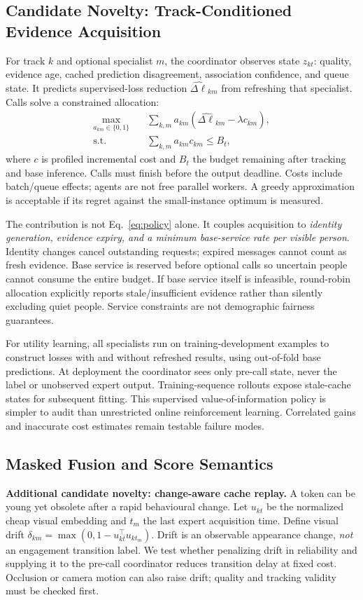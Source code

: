 \documentclass[a4paper,conference]{IEEEtran}
\begin{document}
\subsection{Candidate Novelty: Track-Conditioned Evidence Acquisition}
For track $k$ and optional specialist $m$, the coordinator observes state $z_{kt}$: quality, evidence age, cached prediction disagreement, association confidence, and queue state. It predicts supervised-loss reduction $\widehat{\Delta\ell}_{km}$ from refreshing that specialist. Calls solve a constrained allocation:
\begin{align}
\max_{a_{km}\in\{0,1\}}\quad &\sum_{k,m}a_{km}(\widehat{\Delta\ell}_{km}-\lambda c_{km}),\label{eq:policy}\\
\text{s.t.}\quad &\sum_{k,m}a_{km}c_{km}\le B_t,\nonumber
\end{align}
where $c$ is profiled incremental cost and $B_t$ the budget remaining after tracking and base inference. Calls must finish before the output deadline. Costs include batch/queue effects; agents are not free parallel workers. A greedy approximation is acceptable if its regret against the small-instance optimum is measured.

The contribution is not Eq.~\ref{eq:policy} alone. It couples acquisition to \emph{identity generation, evidence expiry, and a minimum base-service rate per visible person}. Identity changes cancel outstanding requests; expired messages cannot count as fresh evidence. Base service is reserved before optional calls so uncertain people cannot consume the entire budget. If base service itself is infeasible, round-robin allocation explicitly reports stale/insufficient evidence rather than silently excluding quiet people. Service constraints are not demographic fairness guarantees.

For utility learning, all specialists run on training-development examples to construct losses with and without refreshed results, using out-of-fold base predictions. At deployment the coordinator sees only pre-call state, never the label or unobserved expert output. Training-sequence rollouts expose stale-cache states for subsequent fitting. This supervised value-of-information policy is simpler to audit than unrestricted online reinforcement learning. Correlated gains and inaccurate cost estimates remain testable failure modes.

\subsection{Masked Fusion and Score Semantics}
\textbf{Additional candidate novelty: change-aware cache replay.} A token can be young yet obsolete after a rapid behavioural change. Let $u_{kt}$ be the normalized cheap visual embedding and $t_m$ the last expert acquisition time. Define visual drift $\delta_{km}=\max(0,1-u_{kt}^{\top}u_{kt_m})$. Drift is an observable appearance change, \emph{not} an engagement transition label. We test whether penalizing drift in reliability and supplying it to the pre-call coordinator reduces transition delay at fixed cost. Occlusion or camera motion can also raise drift; quality and tracking validity must be checked first.
\end{document}
